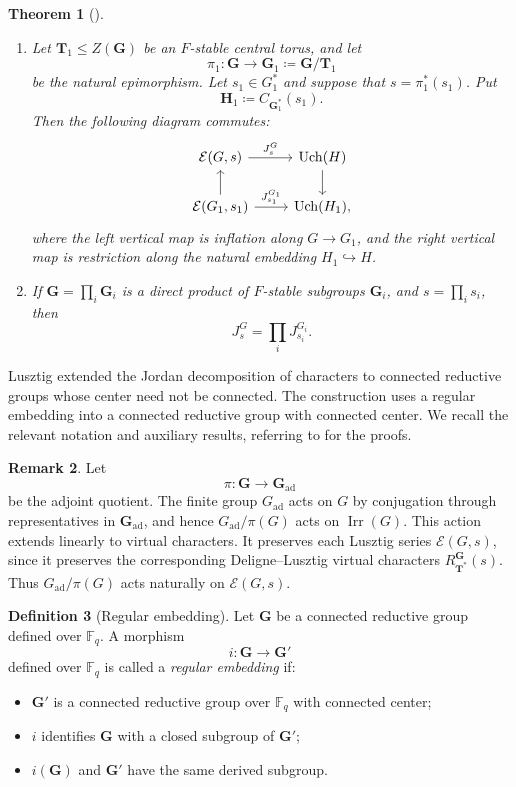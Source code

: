 \documentclass{amsart}
\theoremstyle{plain}
\numberwithin{equation}{section}
\newtheorem{theorem}{Theorem}[section]
\theoremstyle{definition}
\newtheorem{definition}[theorem]{Definition}
\newtheorem{remark}[theorem]{Remark}
\newcommand{\cE}{\mathcal{E}}
\newcommand{\Irr}{\operatorname{Irr}}
\newcommand{\fq}{\mathbb{F}_{q}}
\newcommand{\Uch}{\operatorname{Uch}}
\newcommand{\ad}{\operatorname{ad}}
\newcommand{\bG}{\mathbf{G}}
\newcommand{\bT}{\mathbf{T}}
\newcommand{\bH}{\mathbf{H}}
\begin{document}
\begin{theorem}[{\cite[Theorem 7.1]{DM90}}]
\begin{enumerate}
    \item Let \(\bT_1\leq Z(\bG)\) be an \(F\)-stable central torus, and let
    \[
    \pi_1:\bG\longrightarrow \bG_1\coloneqq \bG/\bT_1
    \]
    be the natural epimorphism.  Let \(s_1\in G_1^*\) and suppose that
    \(s=\pi_1^*(s_1)\).  Put
    \[
    \bH_1\coloneqq C_{\bG_1^*}(s_1).
    \]
    Then the following diagram commutes:
    \[
    \begin{tikzcd}
    \cE(G,s)\arrow{r}{J_s^G}
    & \Uch(H) \arrow{d}{} \\
    \cE(G_1,s_1) \arrow{u}{}
    \arrow{r}{J_{s_1}^{G_1}}
    & \Uch(H_1),
    \end{tikzcd}
    \]
    where the left vertical map is inflation along \(G\to G_1\), and the right
    vertical map is restriction along the natural embedding \(H_1\hookrightarrow H\).

    \item If \(\bG=\prod_i \bG_i\) is a direct product of \(F\)-stable
    subgroups \(\bG_i\), and \(s=\prod_i s_i\), then
    \[
    J_s^G=\prod_i J_{s_i}^{G_i}.
    \]
\end{enumerate}
\end{theorem}
Lusztig \cite{Lus88} extended the Jordan decomposition of characters to
connected reductive groups whose center need not be connected.  The construction
uses a regular embedding into a connected reductive group with connected center.
We recall the relevant notation and auxiliary results, referring to
\cite{Lus88} for the proofs.

\begin{remark}
Let
\[
\pi:\bG\longrightarrow \bG_{\ad}
\]
be the adjoint quotient.  The finite group \(G_{\ad}\) acts on \(G\) by
conjugation through representatives in \(\bG_{\ad}\), and hence
\(G_{\ad}/\pi(G)\) acts on \(\Irr(G)\).  This action extends linearly to
virtual characters.  It preserves each Lusztig series \(\cE(G,s)\), since it
preserves the corresponding Deligne--Lusztig virtual characters
\(R_{\bT^*}^{\bG}(s)\).  Thus \(G_{\ad}/\pi(G)\) acts naturally on
\(\cE(G,s)\).
\end{remark}

\begin{definition}[Regular embedding]
Let \(\bG\) be a connected reductive group defined over \(\fq\).  A morphism
\[
i:\bG\longrightarrow \bG'
\]
defined over \(\fq\) is called a \emph{regular embedding} if:
\begin{itemize}
    \item \(\bG'\) is a connected reductive group over \(\fq\) with connected
    center;

    \item \(i\) identifies \(\bG\) with a closed subgroup of \(\bG'\);

    \item \(i(\bG)\) and \(\bG'\) have the same derived subgroup.
\end{itemize}
\end{definition}
\end{document}
